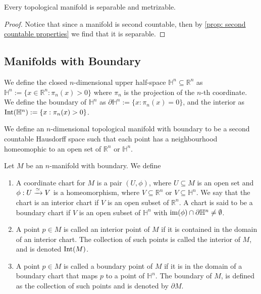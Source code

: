 \begin{proposition}
  Every topological manifold is separable and metrizable.
\end{proposition}

\begin{proof}
  Notice that since a manifold is second countable, then by \cref{prop: second
  countable properties} we find that it is separable. 
\end{proof}

\subsection{Manifolds with Boundary}

\begin{definition}
  We define the closed \(n\)-dimensional upper half-space \(\mathbb H^n
  \subseteq \mathbb{R}^n\) as \(\mathbb H^n := \{x \in \mathbb{R}^n : \pi_n(x) >
  0\}\) where \(\pi_n\) is the projection of the \(n\)-th coordinate. We define
  the boundary of \(\mathbb H^n\) as \(\partial \mathbb H^n := \{x : \pi_n(x) =
  0\}\), and the interior as \(\operatorname{Int}(\mathbb H^n) := \{x : \pi_n(x) > 0\}\).
\end{definition}

\begin{definition}
  \label{def: manifold with boundary}
  We define an \(n\)-dimensional topological manifold with boundary to be a
  second countable Hausdorff space such that each point has a neighbourhood
  homeomophic to an open set of \(\mathbb{R}^n\) or \(\mathbb H^n\).
\end{definition}

\begin{definition}[Miscelaneous]
  Let \(M\) be an \(n\)-manifold with boundary. We define
  \begin{enumerate}[(MB1)]
    \item A coordinate chart for \(M\) is a pair \((U, \phi)\), where \(U
      \subseteq M\) is an open set and \(\phi: U \xrightarrow{\simeq} V\) is a
      homeomorphism, where \(V \subseteq \mathbb{R}^n\) or \(V \subseteq
      \mathbb H^n\). We say that the chart is an interior chart if \(V\) is an
      open subset of \(\mathbb{R}^n\). A chart is said to be a boundary chart
      if \(V\) is an open subset of \(\mathbb H^n\) with \(\operatorname{im}(\phi) \cap
      \partial \mathbb H^n \neq \emptyset\).
    \item A point \(p \in M\) is called an interior point of \(M\) if it is
      contained in the domain of an interior chart. The collection of such
      points is called the interior of \(M\), and is denoted \(\operatorname{Int}(M)\).
    \item A point \(p \in M\) is called a boundary point of \(M\) if it is in
      the domain of a boundary chart that maps \(p\) to a point of \(\mathbb
      H^n\). The boundary of \(M\), is defined as the collection of such points
      and is denoted by \(\partial M\).
  \end{enumerate}
\end{definition}

